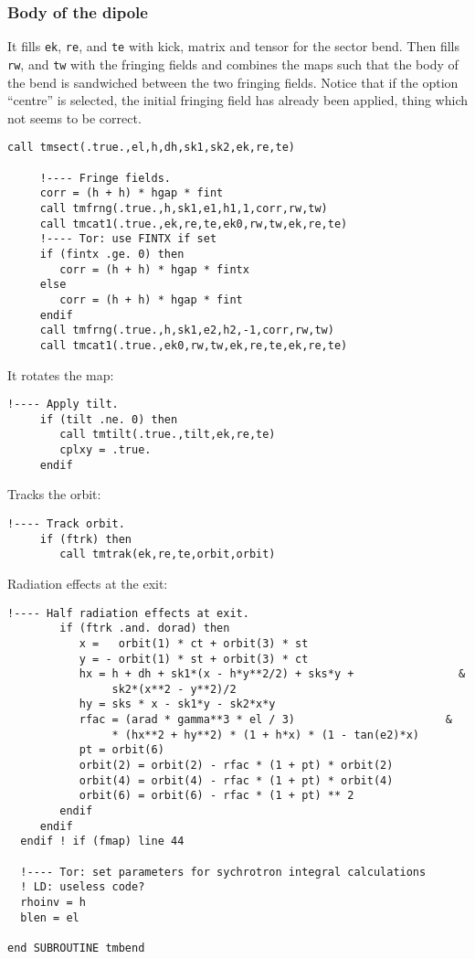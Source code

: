 \documentclass{cern-art} %
\renewcommand{\L}[1]{\lstinline[firstnumber=last]{#1}}
\begin{document}
\subsubsection{Body of the dipole}
  It fills  \L{ek},  \L{re}, and \L{te} with kick, matrix and tensor for the sector bend. Then fills  \L{rw}, and \L{tw} with the fringing fields and combines the maps such that the body of the bend is sandwiched between the two fringing fields. Notice that if the option ``centre'' is selected, the initial fringing field has  already been applied, thing which not seems to be correct.  
   \begin{lstlisting}[firstnumber=last]
     call tmsect(.true.,el,h,dh,sk1,sk2,ek,re,te)

     !---- Fringe fields.
     corr = (h + h) * hgap * fint
     call tmfrng(.true.,h,sk1,e1,h1,1,corr,rw,tw)
     call tmcat1(.true.,ek,re,te,ek0,rw,tw,ek,re,te)
     !---- Tor: use FINTX if set
     if (fintx .ge. 0) then
        corr = (h + h) * hgap * fintx
     else
        corr = (h + h) * hgap * fint
     endif
     call tmfrng(.true.,h,sk1,e2,h2,-1,corr,rw,tw)
     call tmcat1(.true.,ek0,rw,tw,ek,re,te,ek,re,te)
\end{lstlisting}
It rotates the map:
\begin{lstlisting}[firstnumber=last]
     !---- Apply tilt.
     if (tilt .ne. 0) then
        call tmtilt(.true.,tilt,ek,re,te)
        cplxy = .true.
     endif
\end{lstlisting}
Tracks the orbit:
\begin{lstlisting}[firstnumber=last]
     !---- Track orbit.
     if (ftrk) then
        call tmtrak(ek,re,te,orbit,orbit)
\end{lstlisting}
Radiation effects at the exit:
\begin{lstlisting}[firstnumber=last]
        !---- Half radiation effects at exit.
        if (ftrk .and. dorad) then
           x =   orbit(1) * ct + orbit(3) * st
           y = - orbit(1) * st + orbit(3) * ct
           hx = h + dh + sk1*(x - h*y**2/2) + sks*y +                &
                sk2*(x**2 - y**2)/2
           hy = sks * x - sk1*y - sk2*x*y
           rfac = (arad * gamma**3 * el / 3)                       &
                * (hx**2 + hy**2) * (1 + h*x) * (1 - tan(e2)*x)
           pt = orbit(6)
           orbit(2) = orbit(2) - rfac * (1 + pt) * orbit(2)
           orbit(4) = orbit(4) - rfac * (1 + pt) * orbit(4)
           orbit(6) = orbit(6) - rfac * (1 + pt) ** 2
        endif
     endif
  endif ! if (fmap) line 44

  !---- Tor: set parameters for sychrotron integral calculations
  ! LD: useless code?
  rhoinv = h
  blen = el

end SUBROUTINE tmbend
\end{lstlisting}
\end{document}
